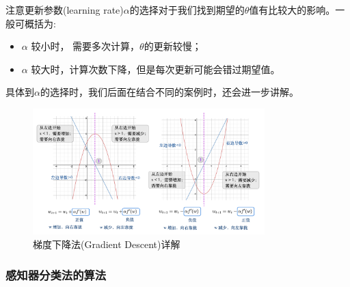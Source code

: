 \documentclass[12pt]{article}
\numberwithin{figure}{section}
\newenvironment{fullmodel}{
			\smallskip\noindent
			\begin{minipage}{\textwidth+\marginparwidth+\marginparsep}\smallskip\smallskip}
			{\smallskip\smallskip\end{minipage}\vspace{.1in}
			}
\numberwithin{equation}{section}
\begin{document}
\begin{remark}
注意更新参数(learning rate)$\alpha$的选择对于我们找到期望的$\theta$值有比较大的影响。一般可概括为:
\begin{itemize}
	\item $\alpha$ 较小时， 需要多次计算，$\theta$的更新较慢；
	\item $\alpha$ 较大时，计算次数下降，但是每次更新可能会错过期望值。
\end{itemize}
具体到$\alpha$的选择时，我们后面在结合不同的案例时，还会进一步讲解。
\end{remark}
\begin{fullmodel}
	\begin{figure}[H]
		\centering
		\includegraphics[width=0.8\textwidth]{fig/C2C2GradientDes}
		\caption{梯度下降法(Gradient Descent)详解}
	\end{figure}
\end{fullmodel}


\subsubsection{感知器分类法的算法}
\end{document}
